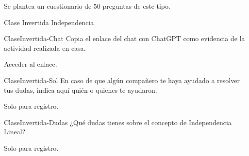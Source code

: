 \documentclass[a4,11pt]{aleph-notas}
\begin{document}
Se plantea un cuestionario de 50 preguntas de este tipo.


\begin{quiz}{Clase Invertida Independencia}
    
\begin{essay}[response format=text, response field lines=5]%
    {ClaseInvertida-Chat}
    Copia el enlace del chat con ChatGPT como evidencia de la actividad realizada en casa.
    \item Acceder al enlace.
\end{essay}

\begin{essay}[response format=text, response field lines=5]%
    {ClaseInvertida-Sol}
    En caso de que algún compañero te haya ayudado a resolver tus dudas, indica aquí quién o quienes te ayudaron.
    \item Solo para registro.
\end{essay}

\begin{essay}[response format=text, response field lines=5]%
    {ClaseInvertida-Dudas}
    ¿Qué dudas tienes sobre el concepto de Independencia Lineal?
    \item Solo para registro.
\end{essay}


\end{quiz}
\end{document}
